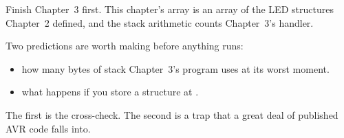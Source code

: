 Finish Chapter~3 first. This chapter's array is an array of the LED structures Chapter~2 defined,
and the stack arithmetic counts Chapter~3's handler.

Two predictions are worth making before anything runs:
\begin{itemize}
  \item how many bytes of stack Chapter~3's program uses at its worst moment.
  \item what happens if you store a structure at .
\end{itemize}
The first is the cross-check. The second is a trap that a great deal of published AVR code falls
into.








